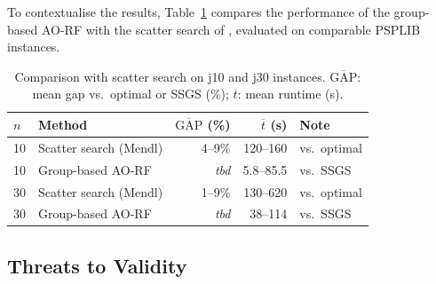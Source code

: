 

To contextualise the results, Table~\ref{tab:comparison_lit}
compares the performance of the group-based AO-RF with the
scatter search of \cite{Mendl2024}, evaluated on comparable
PSPLIB instances.

\begin{table}[htbp]
\centering
\renewcommand{\arraystretch}{1.35}
\caption{Comparison with \cite{Mendl2024} scatter search
         on j10 and j30 instances.
         $\overline{\mathrm{GAP}}$: mean gap vs.\ optimal
         or SSGS (\%);
         $\overline{t}$: mean runtime (s).}
\label{tab:comparison_lit}
\begin{tabular}{l l r r l}
\hline
$n$ &
\textbf{Method} &
$\overline{\mathrm{GAP}}$ (\%) &
$\overline{t}$ (s) &
\textbf{Note} \\
\hline
10 & Scatter search (Mendl) & 4--9\% & 120--160
   & vs.\ optimal \\
10 & Group-based AO-RF      & \textit{tbd} & 5.8--85.5
   & vs.\ SSGS \\
\hline
30 & Scatter search (Mendl) & 1--9\% & 130--620
   & vs.\ optimal \\
30 & Group-based AO-RF      & \textit{tbd} & 38--114
   & vs.\ SSGS \\
\hline
\end{tabular}
\end{table}


\subsection{Threats to Validity}
\label{subsec:threats}


